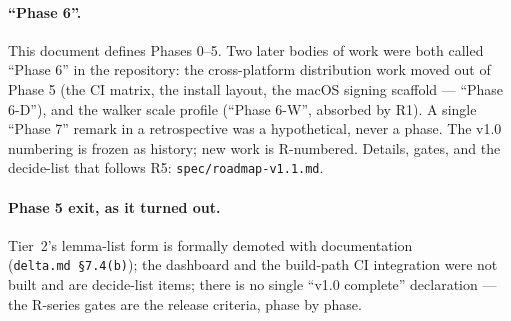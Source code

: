 \documentclass[11pt,letterpaper]{article}
\begin{document}
\paragraph{``Phase 6''.} This document defines Phases 0--5. Two later
bodies of work were both called ``Phase 6'' in the repository: the
cross-platform distribution work moved out of Phase 5 (the CI matrix,
the install layout, the macOS signing scaffold --- ``Phase 6-D''), and
the walker scale profile (``Phase 6-W'', absorbed by R1). A single
``Phase 7'' remark in a retrospective was a hypothetical, never a
phase. The v1.0 numbering is frozen as history; new work is
R-numbered. Details, gates, and the decide-list that follows R5:
\texttt{spec/roadmap-v1.1.md}.

\paragraph{Phase 5 exit, as it turned out.} Tier~2's lemma-list form
is formally demoted with documentation (\texttt{delta.md~\S7.4(b)});
the dashboard and the build-path CI integration were not built and
are decide-list items; there is no single ``v1.0 complete''
declaration --- the R-series gates are the release criteria, phase by
phase.
\end{document}

